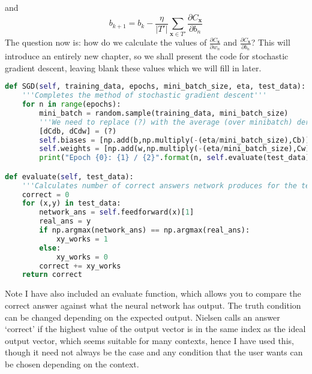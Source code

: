 \documentclass[10pt]{article}
\begin{document}
and
\[
b_{k+1} = b_k - \frac{\eta}{|T'|} \sum_{\mathbf{x} \in T'} \frac{\partial C_{\mathbf{x}}}{\partial b_n}

\]
The question now is: how do we calculate the values of $\frac{\partial C_{\mathbf{x}}}{\partial w_n}$ and $\frac{\partial C_{\mathbf{x}}}{\partial b_n}$? This will introduce an entirely new chapter, so we shall present the code for stochastic gradient descent, leaving blank these values which we will fill in later.
\begin{lstlisting}[language=Python, breaklines, basicstyle=\small]
def SGD(self, training_data, epochs, mini_batch_size, eta, test_data):
	'''Completes the method of stochastic gradient descent'''
	for n in range(epochs):
		mini_batch = random.sample(training_data, mini_batch_size)
		'''We need to replace (?) with the average (over minibatch) derivative of C wrt each term in bias/weight'''
		[dCdb, dCdw] = (?)
		self.biases = [np.add(b,np.multiply(-(eta/mini_batch_size),Cb)) for b, Cb in zip(self.biases, dCdb)]
		self.weights = [np.add(w,np.multiply(-(eta/mini_batch_size),Cw)) for w, Cw in zip(self.weights, dCdw)]
		print("Epoch {0}: {1} / {2}".format(n, self.evaluate(test_data), len(test_data)))

def evaluate(self, test_data):
	'''Calculates number of correct answers network produces for the test data'''
	correct = 0
	for (x,y) in test_data:
		network_ans = self.feedforward(x)[1]
		real_ans = y
		if np.argmax(network_ans) == np.argmax(real_ans):
			xy_works = 1
		else:
			xy_works = 0
		correct += xy_works
	return correct
\end{lstlisting}
Note I have also included an evaluate function, which allows you to compare the correct answer against what the neural network has output. The truth condition can be changed depending on the expected output. Nielsen calls an answer `correct' if the highest value of the output vector is in the same index as the ideal output vector, which seems suitable for many contexts, hence I have used this, though it need not always be the case and any condition that the user wants can be chosen depending on the context.
\end{document}
